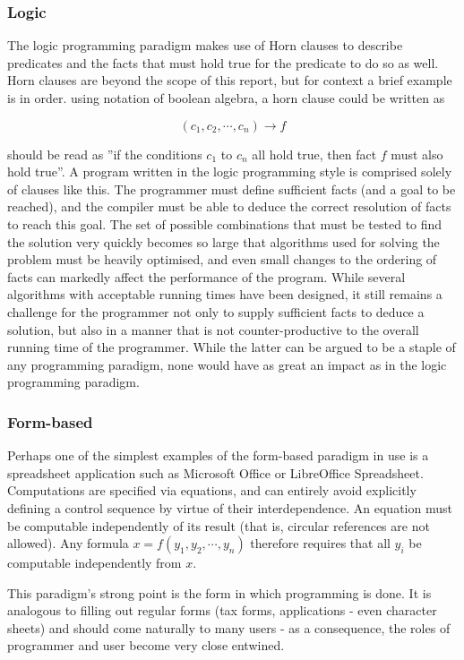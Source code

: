 \subsubsection*{Logic}
The logic programming paradigm makes use of Horn clauses to describe predicates and the facts that must hold true for the predicate to do so as well. Horn clauses are beyond the scope of this report, but for context a brief example is in order. using notation of boolean algebra, a horn clause could be written as 

\[
(c_1, c_2, \cdots , c_n) \rightarrow f
\]

should be read as ''if the conditions $c_1$ to $c_n$ all hold true, then fact $f$ must also hold true''. A program written in the logic programming style is comprised solely of clauses like this. The programmer must define sufficient facts (and a goal to be reached), and the compiler must be able to deduce the correct resolution of facts to reach this goal. The set of possible combinations that must be tested to find the solution very quickly becomes so large that algorithms used for solving the problem must be heavily optimised, and even small changes to the ordering of facts can markedly affect the performance of the program. While several algorithms with acceptable running times have been designed, it still remains a challenge for the programmer not only to supply sufficient facts to deduce a solution, but also in a manner that is not counter-productive to the overall running time of the programmer. While the latter can be argued to be a staple of any programming paradigm, none would have as great an impact as in the logic programming paradigm.

\subsubsection*{Form-based}
Perhaps one of the simplest examples of the form-based paradigm in use is a spreadsheet application such as Microsoft Office or LibreOffice Spreadsheet. Computations are specified via equations, and can entirely avoid explicitly defining a control sequence by virtue of their interdependence. An equation must be computable independently of its result (that is, circular references are not allowed). Any formula $x = f(y_1, y_2, \cdots , y_n)$ therefore requires that all $y_i$ be computable independently from $x$.

This paradigm's strong point is the form in which programming is done. It is analogous to filling out regular forms (tax forms, applications - even character sheets) and should come naturally to many users - as a consequence, the roles of programmer and user become very close entwined.

